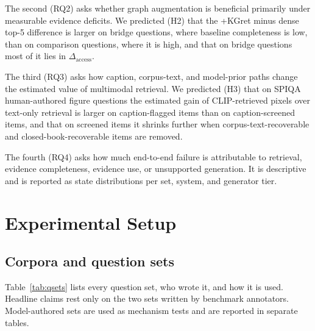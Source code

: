 \documentclass[preprint,12pt]{elsarticle}
\begin{document}
The second (RQ2) asks whether graph augmentation is beneficial primarily under
measurable evidence deficits. We predicted (H2) that the +KGret minus dense
top-5 difference is larger on bridge questions, where baseline completeness is
low, than on comparison questions, where it is high, and that on bridge
questions most of it lies in $\Delta_{\text{access}}$.

The third (RQ3) asks how caption, corpus-text, and model-prior paths change
the estimated value of multimodal retrieval. We predicted (H3) that on SPIQA
human-authored figure questions the estimated gain of CLIP-retrieved pixels
over text-only retrieval is larger on caption-flagged items than on
caption-screened items, and that on screened items it shrinks further when
corpus-text-recoverable and closed-book-recoverable items are removed.

The fourth (RQ4) asks how much end-to-end failure is attributable to
retrieval, evidence completeness, evidence use, or unsupported generation. It
is descriptive and is reported as state distributions per set, system, and
generator tier.


\section{Experimental Setup}
\label{sec:setup}

\subsection{Corpora and question sets}
\label{sec:corpora}

Table~\ref{tab:qsets} lists every question set, who wrote it, and how it is
used. Headline claims rest only on the two sets written by benchmark
annotators. Model-authored sets are used as mechanism tests and are reported
in separate tables.
\end{document}
